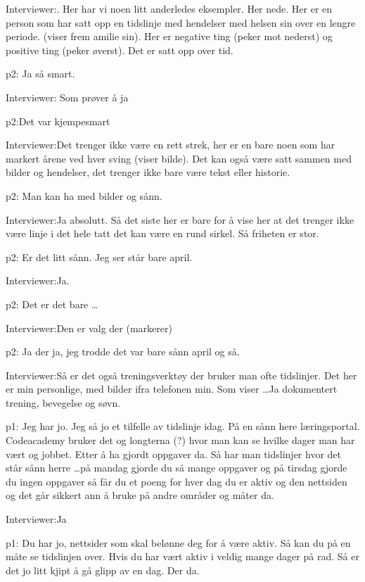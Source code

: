 \documentclass[11pt, norsk, a4paper]{article}
\begin{document}
\textcolor{myBlue} {Interviewer:}. Her har vi noen litt anderledes eksempler. Her nede. Her er en person som har satt opp en tidslinje med hendelser med helsen sin over en lengre periode. (viser frem amilie sin). Her er negative ting (peker mot nederst) og positive ting (peker øverst). Det er satt opp over tid.

\textcolor{myYellow} {p2:} Ja så smart.

\textcolor{myBlue} {Interviewer:} Som prøver å ja

\textcolor{myYellow} {p2:}Det var kjempesmart

\textcolor{myBlue} {Interviewer:}Det trenger ikke være en rett strek, her er en bare noen som har markert årene ved hver sving (viser bilde). Det kan også være satt sammen med bilder og hendelser, det trenger ikke bare være tekst eller historie. 

\textcolor{myYellow} {p2:} Man kan ha med bilder og sånn. 

\textcolor{myBlue} {Interviewer:}Ja absolutt. Så det siste her er bare for å vise her at det trenger ikke være linje i det hele tatt det kan være en rund sirkel. Så friheten er stor.

\textcolor{myYellow} {p2:} Er det litt sånn. Jeg ser står bare april. 

\textcolor{myBlue} {Interviewer:}Ja.

\textcolor{myYellow} {p2:} Det er det bare \dots

\textcolor{myBlue} {Interviewer:}Den er valg der (markerer)

\textcolor{myYellow} {p2:} Ja der ja, jeg trodde det var bare sånn april og så. 

\textcolor{myBlue} {Interviewer:}Så er det også treningsverktøy der bruker man ofte tidslinjer. Det her er min personlige, med bilder ifra telefonen min. Som viser \dots Ja dokumentert trening, bevegelse og søvn.

\textcolor{myGreen} {p1:} Jeg har jo. Jeg så jo et tilfelle av tidslinje idag. På en sånn here læringsportal. Codeacademy bruker det og longterna (?) hvor man kan se hvilke dager man har vært og jobbet. Etter å ha gjordt oppgaver da. Så har man tidslinjer hvor det står sånn herre \dots på mandag gjorde du så mange oppgaver og på tirsdag gjorde du ingen oppgaver så får du et poeng for hver dag du er aktiv og den nettsiden og det går sikkert ann å bruke på andre områder og måter da.

\textcolor{myBlue} {Interviewer:}Ja 

\textcolor{myGreen} {p1:} Du har jo, nettsider som skal belønne deg for å være aktiv. Så kan du på en måte se tidslinjen over. Hvis du har vært aktiv i veldig mange dager på rad. Så er det jo litt kjipt å gå glipp av en dag. Der da.
\end{document}

